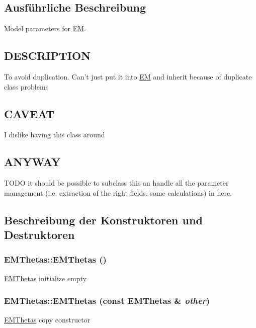 \subsection{Ausführliche Beschreibung}
Model parameters for \hyperlink{classCDA_1_1EM}{EM}. \hypertarget{ProbabilisticClustering_8h_09_09_DESCRIPTION}{}\subsection{DESCRIPTION}\label{ProbabilisticClustering_8h_09_09_DESCRIPTION}
To avoid duplication. Can't just put it into \hyperlink{classCDA_1_1EM}{EM} and inherit because of duplicate class problems\hypertarget{classCDA_1_1EMThetas_ARCHITECTURE}{}\subsection{CAVEAT}\label{classCDA_1_1EMThetas_ARCHITECTURE}
I dislike having this class around\hypertarget{classCDA_1_1EMThetas_ANYWAY}{}\subsection{ANYWAY}\label{classCDA_1_1EMThetas_ANYWAY}
TODO it should be possible to subclass this an handle all the parameter management (i.e. extraction of the right fields, some calculations) in here. 

\subsection{Beschreibung der Konstruktoren und Destruktoren}
\hypertarget{classCDA_1_1EMThetas_a97b7888efc058416d40ab7a24c80a2a0}{
\subsubsection[{EMThetas}]{\setlength{\rightskip}{0pt plus 5cm}EMThetas::EMThetas ()}}
\label{classCDA_1_1EMThetas_a97b7888efc058416d40ab7a24c80a2a0}
\hyperlink{classCDA_1_1EMThetas}{EMThetas} initialize empty \hypertarget{classCDA_1_1EMThetas_aaa3c2d20ee5d95a8b38d40e7c6d0b1a7}{
\subsubsection[{EMThetas}]{\setlength{\rightskip}{0pt plus 5cm}EMThetas::EMThetas (const {\bf EMThetas} \& {\em other})}}
\label{classCDA_1_1EMThetas_aaa3c2d20ee5d95a8b38d40e7c6d0b1a7}
\hyperlink{classCDA_1_1EMThetas}{EMThetas} copy constructor 

